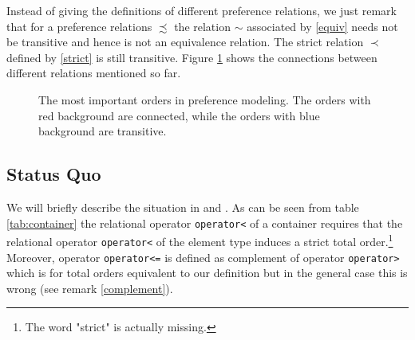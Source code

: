 ﻿\documentclass[a4paper,11pt,twoside,final]{article}
\newcommand{\tcode}[1]{\lstinline[basicstyle=\normalsize\ttfamily]{#1}}
\numberwithin{equation}{subsection}
\begin{document}
Instead of giving the definitions of different preference relations, we just remark that for a preference relations $\precsim$ the relation $\sim$ associated by \ref{equiv} needs not be transitive and hence is not an equivalence relation. The strict relation $\prec$ defined by \ref{strict} is still transitive. Figure \ref{fig:relations} shows the connections between different relations mentioned so far.
\begin{figure}[h!]
\centering
{}
\caption{The most important orders in preference modeling. The orders with \textcolor{DarkRed!50}{red background} are connected, while the orders with \textcolor{DarkSlateBlue!50}{blue background} are transitive.}
\label{fig:relations}
\end{figure}

\subsection{Status Quo}
We will briefly describe the situation in  and . As can be seen from table \ref{tab:container} the relational operator \tcode{operator<} of a container requires that the relational operator \tcode{operator<} of the element type induces a strict total order.\footnote{The word "strict" is actually missing.} Moreover, operator \tcode{operator<=} is defined as complement of operator \tcode{operator>} which is for total orders equivalent to our definition but in the general case this is wrong (see remark \ref{complement}).
\end{document}
